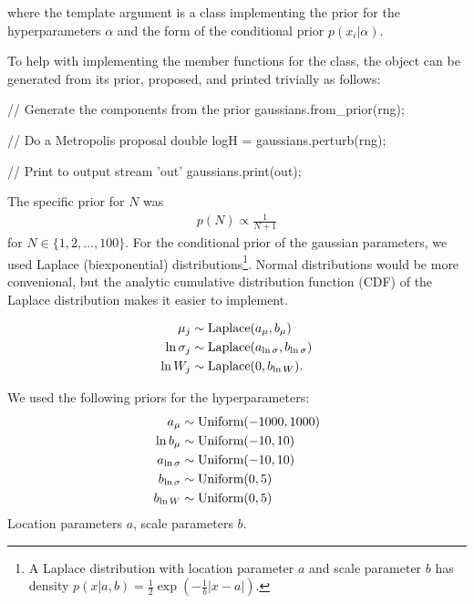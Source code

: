 \documentclass[article]{jss}
\begin{document}
\begin{CodeChunk}
\begin{CodeInput}
class MyModel
{
	private:
        DNest4::RJObject<MyConditionalPrior> gaussians;
....
\end{CodeInput}
\end{CodeChunk}
where the template argument 
is a class implementing the prior for the hyperparameters
$\alpha$ and the form of the conditional prior $p(x_i | \alpha)$.

To help with implementing the member functions for the  class,
the  object can be generated from its prior, proposed,
and printed trivially as follows:
\begin{CodeInput}
\begin{CodeChunk}
    // Generate the components from the prior
    gaussians.from_prior(rng);

    // Do a Metropolis proposal
    double logH = gaussians.perturb(rng);

    // Print to output stream 'out'
    gaussians.print(out);
\end{CodeChunk}
\end{CodeInput}


The specific prior for $N$ was
\begin{align}
p(N) \propto \frac{1}{N+1}
\end{align}
for $N \in \{1, 2, ..., 100\}$.
For the conditional prior of the gaussian parameters,
we used Laplace (biexponential)
distributions\footnote{A Laplace
distribution with location parameter $a$ and scale parameter
$b$ has density $p(x | a, b) = \frac{1}{2}\exp\left(-\frac{1}{b}|x - a|\right)$.}.
Normal distributions would be more convenional, but the analytic cumulative
distribution function (CDF) of the Laplace distribution makes it easier to
implement.

\begin{align}
\mu_j &\sim \textnormal{Laplace}(a_\mu, b_\mu)\\
\ln\sigma_j &\sim \textnormal{Laplace}(a_{\ln\sigma}, b_{\ln\sigma})\\
\ln W_j &\sim \textnormal{Laplace}(0, b_{\ln W}).
\end{align}

We used the following priors for the hyperparameters:
\begin{align}
a_\mu &\sim \textnormal{Uniform}(-1000, 1000)\\
\ln b_\mu &\sim \textnormal{Uniform}(-10, 10)\\
a_{\ln\sigma} &\sim \textnormal{Uniform}(-10, 10)\\
b_{\ln\sigma} &\sim \textnormal{Uniform}(0, 5)\\
b_{\ln W} &\sim \textnormal{Uniform}(0, 5)
\end{align}
Location parameters $a$, scale parameters $b$.
\end{document}
